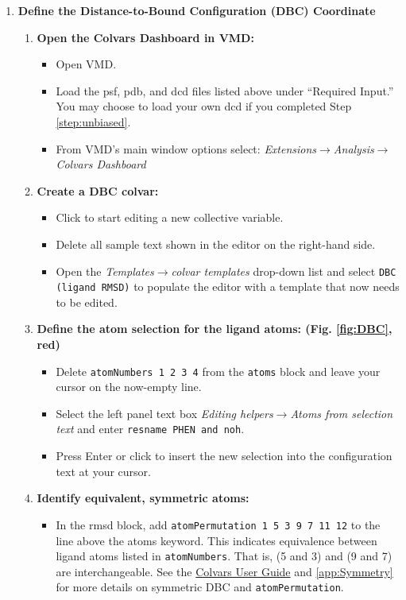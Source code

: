 \documentclass[9pt,tutorial,pubversion]{Styling/livecoms}
\newcommand{\button}[1]{\inlineBox[gray]{\texttt{#1}}}
\newcommand{\menu}[1]{\textit{#1}}
\newcommand{\option}[1]{\texttt{#1}}
\newcommand{\textInput}[1]{\texttt{#1}}
\begin{document}
\begin{enumerate}
    \item \textbf{Define the Distance-to-Bound Configuration (DBC) Coordinate}
        \begin{enumerate}[label=\alph*., ref=\theenumi.\alph*]
             \item \textbf{Open the Colvars Dashboard in VMD:}
             \begin{itemize}
                \item Open VMD.
                 \item Load the psf, pdb, and dcd files listed above under ``Required Input.'' You may choose to load your own dcd if you completed Step \ref{step:unbiased}.
                 \item From VMD's main window options select: \menu{Extensions$\rightarrow$Analysis$\rightarrow$Colvars Dashboard}
             \end{itemize}
             \item \textbf{Create a DBC colvar:}
             \begin{itemize}
                 \item Click \button{New [Ctrl-n]} to start editing a new collective variable.
                \item Delete all sample text shown in the editor on the right-hand side.
                \item Open the \menu{Templates$\rightarrow$colvar templates} drop-down list and select \option{DBC (ligand RMSD)} to populate the editor with a template that now needs to be edited.
            \end{itemize}
             \item \label{step:ligNumbers}\textbf{Define the atom selection for the ligand atoms: (Fig. \ref{fig:DBC}, red)} 
             \begin{itemize}
                 \item Delete  \textInput{atomNumbers 1 2 3 4} from the \textInput{atoms} block and leave your cursor on the now-empty line.
                 \item Select the left panel text box \menu{Editing helpers$\rightarrow$Atoms from selection text} and enter \textInput{resname PHEN and noh}.
                 \item Press Enter or click \button{Insert [Enter]} to insert the new selection into the configuration text at your cursor.
            \end{itemize}
            \item \label{step:symmetry}\textbf{Identify equivalent, symmetric atoms:}
             \begin{itemize}
                 \item In the rmsd block, add \textInput{atomPermutation 1 5 3 9 7 11 12} to the line above the atoms keyword. 
                 This indicates equivalence between ligand atoms listed in \textInput{atomNumbers}. That is, (5 and 3) and (9 and 7) are interchangeable. See the \href{https://colvars.github.io/colvars-refman-vmd/colvars-refman-vmd.html#sec:cvc_rmsd}{Colvars User Guide} and \ref{app:Symmetry} for more details on symmetric DBC and \textInput{atomPermutation}.
            \end{itemize}


\end{enumerate}
\end{enumerate}
\end{document}
